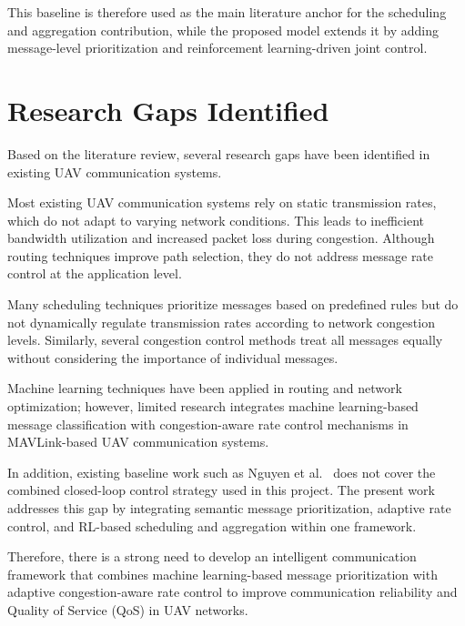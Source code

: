 This baseline is therefore used as the main literature anchor for the
scheduling and aggregation contribution, while the proposed model extends
it by adding message-level prioritization and reinforcement learning-driven
joint control.


\section{Research Gaps Identified}

Based on the literature review, several research gaps have been
identified in existing UAV communication systems.

Most existing UAV communication systems rely on static transmission
rates, which do not adapt to varying network conditions. This leads
to inefficient bandwidth utilization and increased packet loss
during congestion. Although routing techniques improve path
selection, they do not address message rate control at the
application level.

Many scheduling techniques prioritize messages based on predefined
rules but do not dynamically regulate transmission rates according
to network congestion levels. Similarly, several congestion control
methods treat all messages equally without considering the
importance of individual messages.

Machine learning techniques have been applied in routing and
network optimization; however, limited research integrates
machine learning-based message classification with congestion-aware
rate control mechanisms in MAVLink-based UAV communication systems.

In addition, existing baseline work such as Nguyen et al.~\cite{nguyen2024acs}
does not cover the combined closed-loop control strategy used in this project.
The present work addresses this gap by integrating semantic message
prioritization, adaptive rate control, and RL-based scheduling and aggregation
within one framework.

Therefore, there is a strong need to develop an intelligent
communication framework that combines machine learning-based
message prioritization with adaptive congestion-aware rate control
to improve communication reliability and Quality of Service (QoS)
in UAV networks.